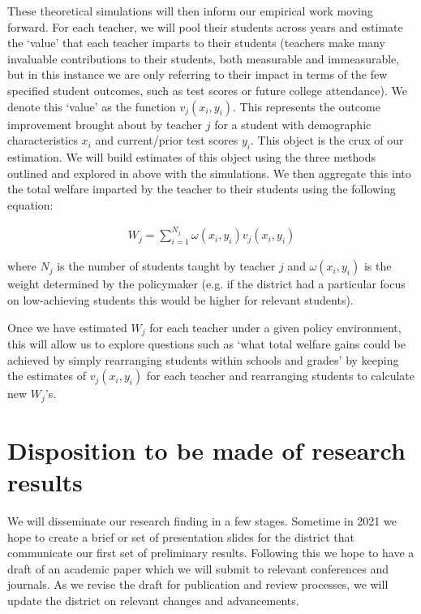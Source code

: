 \documentclass[letterpaper,12pt]{article}
\begin{document}
These theoretical simulations will then inform our empirical work moving forward. For each teacher, we will pool their students across years and estimate the `value' that each teacher imparts to their students (teachers make many invaluable contributions to their students, both measurable and immeasurable, but in this instance we are only referring to their impact in terms of the few specified student outcomes, such as test scores or future college attendance). We denote this `value' as the function $v_j(x_i, y_i)$. This represents the outcome improvement brought about by teacher $j$ for a student with demographic characteristics $x_i$ and current/prior test scores $y_i$. This object is the crux of our estimation. We will build estimates of this object using the three methods outlined and explored in above with the simulations. We then aggregate this into the total welfare imparted by the teacher to their students using the following equation:

    \begin{gather*}
        W_j = \sum_{i=1}^{N_j} \omega(x_i, y_i) v_j(x_i, y_i)
    \end{gather*}

\noindent where $N_j$ is the number of students taught by teacher $j$ and $\omega(x_i, y_i)$ is the weight determined by the policymaker (e.g. if the district had a particular focus on low-achieving students this would be higher for relevant students).

Once we have estimated $W_j$ for each teacher under a given policy environment, this will allow us to explore questions such as `what total welfare gains could be achieved by simply rearranging students within schools and grades' by keeping the estimates of $v_j(x_i, y_i)$ for each teacher and rearranging students to calculate new $W_j$'s.





\section{Disposition to be made of research results}
We will disseminate our research finding in a few stages. Sometime in 2021 we hope to create a brief or set of presentation slides for the district that communicate our first set of preliminary results. Following this we hope to have a draft of an academic paper which we will submit to relevant conferences and journals. As we revise the draft for publication and review processes, we will update the district on relevant changes and advancements.



 
 
\end{document}
